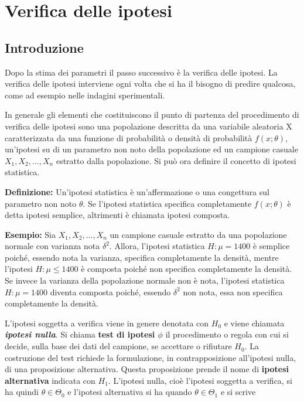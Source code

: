 {}


\chapter{Verifica delle ipotesi}

\section{Introduzione}

Dopo la stima dei parametri il passo successivo è la verifica delle ipotesi. La verifica delle ipotesi interviene ogni volta che si ha il bisogno di predire qualcosa, come ad esempio nelle indagini sperimentali.

In generale gli elementi che costituiscono il punto di partenza del procedimento di verifica delle ipotesi sono una popolazione descritta da una variabile aleatoria X caratterizzata da una funzione di probabilità o densità di probabilità $f(x;\theta)$, un'ipotesi su di un parametro non noto della popolazione ed un campione casuale $X_1, X_2, ..., X_n$ estratto dalla popolazione. Si può ora definire il concetto di ipotesi statistica.

\noindent \textbf{Definizione:} Un'ipotesi statistica è un'affermazione o una congettura sul parametro non noto $\theta$. Se l'ipotesi statistica specifica completamente $f(x;\theta)$ è detta ipotesi semplice, altrimenti è chiamata ipotesi composta.

\noindent \textbf{Esempio:} Sia $X_1, X_2, ..., X_n$ un campione casuale estratto da una popolazione normale con varianza nota $\delta^2$. Allora, l'ipotesi statistica $H: \mu = 1400$ è semplice poiché, essendo nota la varianza, specifica completamente la densità, mentre l'ipotesi $H: \mu \leq 1400$ è composta poiché non specifica completamente la densità. Se invece la varianza della popolazione normale non è nota, l'ipotesi statistica $H:\mu = 1400$ diventa composta poiché, essendo $\delta^2$ non nota, essa non specifica completamente la densità.

L'ipotesi soggetta a verifica viene in genere denotata con $H_0$ e viene chiamata \textbf{\textit{ipotesi nulla}}. Si chiama \textbf{test di ipotesi $\phi$} il procedimento o regola con cui si decide, sulla base dei dati del campione, se accettare o rifiutare $H_0$. La costruzione del test richiede la formulazione, in contrapposizione all'ipotesi nulla, di una proposizione alternativa. Questa proposizione prende il nome di \textbf{ipotesi alternativa} indicata con $H_1$. L'ipotesi nulla, cioè l'ipotesi soggetta a verifica, si ha quindi $\theta \in \Theta_0$ e l'ipotesi alternativa si ha quando $\theta \in \Theta_1$ e si scrive

